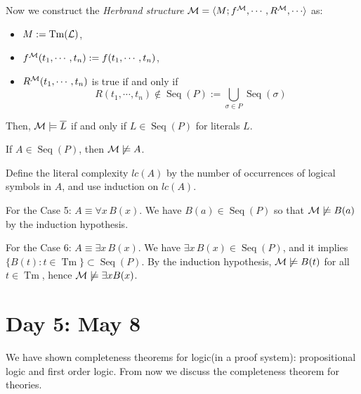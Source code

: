 \documentclass{../../../small}
\DeclareMathOperator{\Tm}{Tm}
\DeclareMathOperator{\Seq}{Seq}
\begin{document}
Now we construct the \emph{Herbrand structure} $\cM=\<M;f^\cM,\cdots,R^\cM,\cdots\>$ as:
\begin{itemize}
\item $M:=\Tm(\cL)$,
\item $f^{\mathcal{M}}(t_1,\cdots,t_n):=f(t_1,\cdots,t_n)$,
\item $R^{\mathcal{M}}(t_1,\cdots,t_n)$ is true if and only if
\[R(t_1,\cdots,t_n)\notin\Seq(P):=\bigcup_{\sigma\in P}\Seq(\sigma)\]
\end{itemize}
Then, $\mathcal{M}\models\overline{L}$ if and only if $L\in\Seq(P)$ for literals $L$.
\begin{clm*}
If $A\in\Seq(P)$, then $\mathcal{M}\not\models A$.
\end{clm*}
\begin{pf}
Define the literal complexity $lc(A)$ by the number of occurrences of logical symbols in $A$, and use induction on $lc(A)$.

For the Case 5: $A\equiv\forall x\,B(x)$.
We have $B(a)\in\Seq(P)$ so that $\mathcal{M}\not\models B(a)$ by the induction hypothesis.

For the Case 6: $A\equiv\exists x\,B(x)$.
We have $\exists x\,B(x)\in\Seq(P)$, and it implies $\{B(t):t\in\Tm\}\subset\Seq(P)$.
By the induction hypothesis, $\mathcal{M}\not\models B(t)$ for all $t\in\Tm$, hence $\mathcal{M}\not\models\exists xB(x)$.
\end{pf}



\newpage
\section{Day 5: May 8}

We have shown completeness theorems for logic(in a proof system): propositional logic and first order logic.
From now we discuss the completeness theorem for theories.
\end{document}
